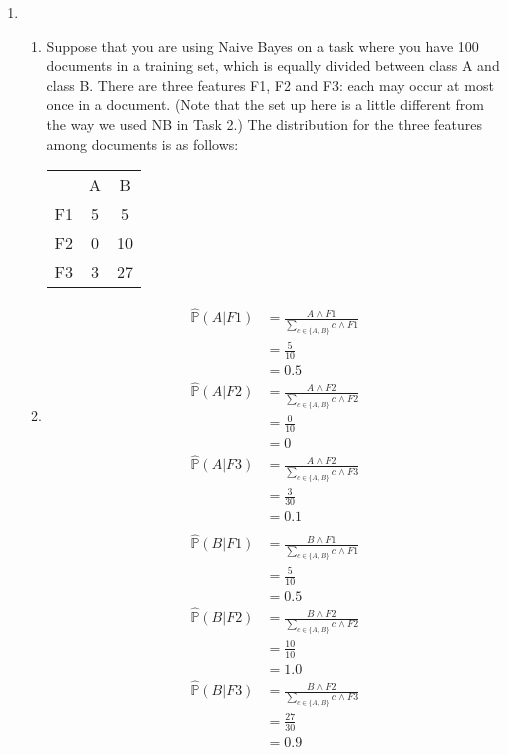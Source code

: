 \documentclass[10pt,\jkfside,a4paper]{article}
\begin{document}
\begin{enumerate}

\item

\begin{enumerate}

\item 
Suppose that you are using Naive Bayes on a task where you have 100
documents in a training set, which is equally divided between class A and
class B. There are three features F1, F2 and F3: each may occur at most
once in a document. (Note that the set up here is a little different from
the way we used NB in Task 2.) The distribution for the three features
among documents is as follows:

\begin{center}
\begin{tabular}{c c c}
& A & B\\
F1 & 5 & 5\\
F2 & 0 & 10\\
F3 & 3 & 27\\
\end{tabular}
\end{center}

\item
\begin{equation}
\begin{split}
\hat{\mathds{P}}(A|F1) &= \frac{A\wedge F1}{\sum_{c \in \{A, B\}} c \wedge F1}\\
					 &= \frac{5}{10}\\
					 &= 0.5\\
\hat{\mathds{P}}(A|F2) &= \frac{A\wedge F2}{\sum_{c \in \{A, B\}} c \wedge F2}\\
					 &= \frac{0}{10}\\
					 &= 0\\
\hat{\mathds{P}}(A|F3) &= \frac{A\wedge F2}{\sum_{c \in \{A, B\}} c \wedge F3}\\
					 &= \frac{3}{30}\\
					 &= 0.1\\
\end{split}
\end{equation}
\begin{equation}
\begin{split}
\hat{\mathds{P}}(B|F1) &= \frac{B\wedge F1}{\sum_{c \in \{A, B\}} c \wedge F1}\\
					 &= \frac{5}{10}\\
					 &= 0.5\\
\hat{\mathds{P}}(B|F2) &= \frac{B\wedge F2}{\sum_{c \in \{A, B\}} c \wedge F2}\\
					 &= \frac{10}{10}\\
					 &= 1.0\\
\hat{\mathds{P}}(B|F3) &= \frac{B\wedge F2}{\sum_{c \in \{A, B\}} c \wedge F3}\\
					 &= \frac{27}{30}\\
					 &= 0.9\\
\end{split}
\end{equation}


\end{enumerate}
\end{enumerate}
\end{document}
